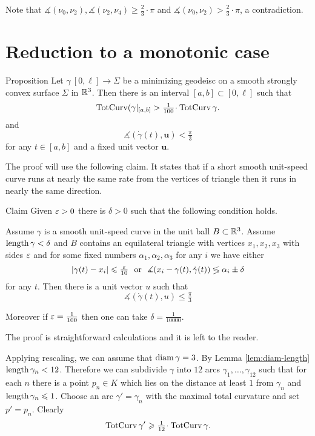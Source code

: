 \documentclass[a4paper,10pt]{amsart}
\begin{document}
Note that $\measuredangle(\nu_0,\nu_2), \measuredangle(\nu_2,\nu_4)\ge\tfrac23\cdot\pi$ and $\measuredangle(\nu_0,\nu_2)>\tfrac23\cdot\pi$,
a contradiction.
\qeds



\section{Reduction to a monotonic case}

\begin{thm}{Proposition}\label{prop:almost-const}
Let $\gamma\:[0,\ell]\to\Sigma$ be a minimizing geodeisc 
on a smooth strongly convex surface $\Sigma$ in $\mathbb{R}^3$.
Then there is an interval $[a,b]\subset[0,\ell]$
such that 
\[\tc(\gamma|_{[a,b]}>\tfrac1{100}\cdot\tc\gamma.\]
and 
\[\measuredangle(\dot\gamma(t),\bm{u})<\tfrac\pi3\] 
for any $t\in[a,b]$
and a fixed unit vector $\bm{u}$.
\end{thm}

The proof will use the following claim.
It states that 
if a short smooth unit-speed curve runs at nearly the same rate from the vertices of triangle then it runs in nearly the same direction.

\begin{thm}{Claim}
Given $\varepsilon>0$ there is $\delta>0$ such that the following condition holds.

Assume $\gamma$ is a smooth unit-speed curve 
in the unit ball $B\subset\mathbb{R}^3$.
Assume 
$\mathop{\rm length}\nolimits\gamma<\delta$ 
and $B$ contains an equilateral triangle with vertices $x_1,x_2,x_3$ with sides $\varepsilon$
and for some fixed numbers
$\alpha_1,\alpha_2,\alpha_3$
for any $i$
we have either
\[|\gamma(t)-x_i|\le \tfrac\eps{10}\ \ \text{or}\ \ \measuredangle(x_i-\gamma(t),\dot\gamma(t))\lege \alpha_i\pm\delta\]
for any $t$.
Then there is a unit vector $u$ such that
\[\measuredangle(\dot\gamma(t),u)\le\tfrac\pi3\]

Moreover if $\varepsilon=\tfrac1{100}$ 
then one can take $\delta=\tfrac1{10000}$.
\end{thm}

The proof is straightforward calculations
and it is left to the reader.

Applying rescaling, we can assume that $\operatorname{diam}\gamma=3$.
By Lemma \ref{lem:diam-length} $\length\gamma_n\zz<12$.
Therefore we can subdivide $\gamma$ into $12$ 
arcs $\gamma_1,\dots,\gamma_{12}$
such that for each $n$ there is a point $p_n\in K$ 
which lies on the distance at least $1$ from $\gamma_n$ and $\mathop{\rm length}\nolimits\gamma_n\leqslant 1$.
Choose
an arc $\gamma'=\gamma_n$ with the maximal total curvature 
and set $p'=p_n$.
Clearly
\[\tc\gamma'\ge\tfrac1{12}\cdot\tc\gamma.\]
\end{document}
